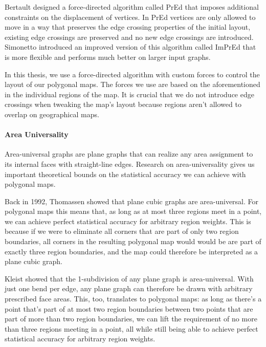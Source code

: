 Bertault \cite{bertault1999force} designed a force-directed algorithm called PrEd that imposes additional constraints on the displacement of vertices.
In PrEd vertices are only allowed to move in a way that preserves the edge crossing properties of the initial layout, \ie{} existing edge crossings are preserved and no new edge crossings are introduced.
Simonetto \etal{} \cite{simonetto2011impred} introduced an improved version of this algorithm called ImPrEd that is more flexible and performs much better on larger input graphs.

In this thesis, we use a force-directed algorithm with custom forces to control the layout of our polygonal maps.
The forces we use are based on the aforementioned  in the individual regions of the map.
It is crucial that we do not introduce edge crossings when tweaking the map's layout because regions aren't allowed to overlap on geographical maps.


\paragraph{Area Universality}

Area-universal graphs are plane graphs that can realize any area assignment to its internal faces with straight-line edges.
Research on area-universality gives us important theoretical bounds on the statistical accuracy we can achieve with polygonal maps.

Back in 1992, Thomassen \cite{thomassen1992plane} showed that plane cubic graphs are area-universal.
For polygonal maps this means that, as long as at most three regions meet in a point, we can achieve perfect statistical accuracy for arbitrary region weights.
This is because if we were to eliminate all corners that are part of only two region boundaries, all corners in the resulting polygonal map would would be are part of exactly three region boundaries, and the map could therefore be interpreted as a plane cubic graph.

Kleist \cite{kleist2018drawing} \cite{kleist2019planar} showed that the 1-subdivision of any plane graph is area-universal.
With just one bend per edge, any plane graph can therefore be drawn with arbitrary prescribed face areas.
This, too, translates to polygonal maps: as long as there's a point that's part of at most two region boundaries between two points that are part of more than two region boundaries, we can lift the requirement of no more than three regions meeting in a point, all while still being able to achieve perfect statistical accuracy for arbitrary region weights.
